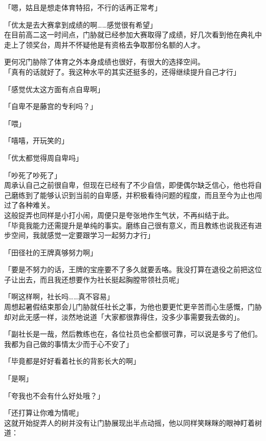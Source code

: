 「嗯，姑且是想走体育特招，不行的话再正常考」

「优太是去大赛拿到成绩的啊……感觉很有希望」\\

在目前高二这一时间点，门胁就已经参加大赛取得了成绩，好几次看到他在典礼中走上了领奖台，周并不怀疑他是有资格去争取那份名额的人才。

更何况门胁除了体育之外本身成绩也很好，有很大的选择空间。\\

「真有的话就好了。我这种水平的其实还挺多的，还得继续提升自己才行」

「感觉优太这方面有点自卑啊」

「自卑不是藤宫的专利吗？」

「喂」

「嘻嘻，开玩笑的」

「优太都觉得周自卑吗」

「吵死了吵死了」\\

周承认自己之前很自卑，但现在已经有了不少自信，即便偶尔缺乏信心，他也将自己磨练到了能够认识到当前的自卑感，并积极看待问题的程度，而且至今为止也闯过了各种难关。\\

这般捉弄也同样是小打小闹，周便只是夸张地作生气状，不再纠结于此。\\

「毕竟我能力还需提升是单纯的事实。磨练自己很有意义，而且教练也说我还有进步空间，我就感觉一定要跟学习一起努力才行」

「田径社的王牌真够努力啊」

「要是不努力的话，王牌的宝座要不了多久就要丢咯。我没打算在退役之前把这位子让出去，而且我还想要作为社长挺起胸膛带领社员呢」

「啊这样啊，社长吗……真不容易」\\

周想起暑假结束那会儿门胁就任社长之事，为他也要更忙更辛苦而心生感慨，门胁却对此无感一样，淡然地说道「大家都很靠得住，没多少事需要我去做的」。

「副社长是一哉，然后教练也在，各位社员也全都很可靠，可以说是多亏了他们。我都为自己做的事情太少而于心不安了」

「毕竟都是好好看着社长的背影长大的啊」

「是啊」

「夸我也不会有什么好处哦？」

「还打算让你难为情呢」\\

这就开始捉弄人的树并没有让门胁展现出半点动摇，他以同样笑眯眯的眼神盯着树道：\\

